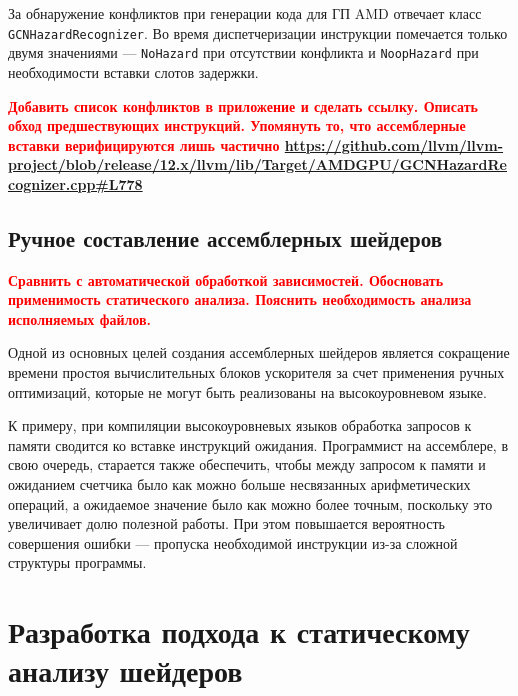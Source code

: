 \documentclass[a4paper,14pt]{extarticle}
\newcommand{\todo}[1]{\textbf{\textcolor{red}{#1}}}
\begin{document}
{За обнаружение конфликтов при генерации кода для ГП AMD отвечает класс \verb|GCNHazardRecognizer|.
Во время диспетчеризации инструкции помечается только двумя значениями — \verb|NoHazard| при
отсутствии конфликта и \verb|NoopHazard| при необходимости вставки слотов задержки.

\todo{Добавить список конфликтов в приложение и сделать ссылку. Описать обход предшествующих инструкций.
Упомянуть то, что ассемблерные вставки верифицируются лишь частично \url{https://github.com/llvm/llvm-project/blob/release/12.x/llvm/lib/Target/AMDGPU/GCNHazardRecognizer.cpp\#L778}}

\subsection{Ручное составление ассемблерных шейдеров}

\todo{Сравнить с автоматической обработкой зависимостей. Обосновать применимость
статического анализа. Пояснить необходимость анализа исполняемых файлов.}

Одной из основных целей создания ассемблерных шейдеров является сокращение
времени простоя вычислительных блоков ускорителя за счет применения ручных оптимизаций,
которые не могут быть реализованы на высокоуровневом языке.

К примеру, при компиляции высокоуровневых языков обработка запросов к памяти сводится ко вставке
инструкций ожидания. Программист на ассемблере, в свою очередь, старается также обеспечить,
чтобы между запросом к памяти и ожиданием счетчика было как можно больше несвязанных
арифметических операций, а ожидаемое значение было как можно более точным, поскольку
это увеличивает долю полезной работы. При этом повышается вероятность совершения
ошибки — пропуска необходимой инструкции из-за сложной структуры программы.

%
%

\section{Разработка подхода к статическому анализу шейдеров}

}
\end{document}

